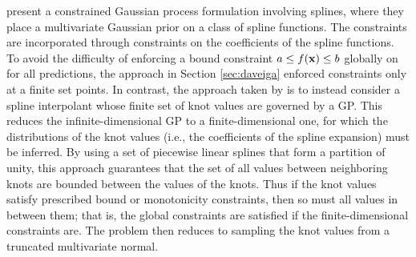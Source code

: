 \label{sec:splines}
 present a constrained Gaussian process formulation involving splines, where they place a multivariate Gaussian prior on a class of spline functions. The constraints are incorporated through constraints on the coefficients of the spline functions. 
To avoid the difficulty of enforcing a bound constraint $a \le f(\bold{x}) \le b$ globally on  for all predictions, the approach in Section \ref{sec:daveiga}  enforced constraints only at a finite set  points. 
In contrast, the approach taken by  is to instead consider a spline interpolant whose finite set of knot values are governed by a GP. This reduces the infinite-dimensional GP to a finite-dimensional one, for which the distributions of the knot values (i.e., the coefficients of the spline expansion) must be inferred. By using a set of piecewise linear splines that form a partition of unity, this approach guarantees that the set of all values between neighboring knots are bounded between the values of the knots. Thus if the knot values satisfy prescribed bound or monotonicity constraints, then so must all values in between them; that is, the global constraints are satisfied if the finite-dimensional constraints are. The problem then reduces to sampling the knot values from a truncated multivariate normal.


